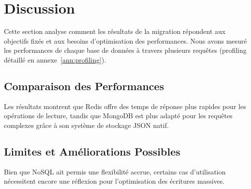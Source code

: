 \chapter{Discussion}
Cette section analyse comment les résultats de la migration répondent aux objectifs fixés et aux besoins d’optimisation des performances. Nous avons mesuré les performances de chaque base de données à travers plusieurs requêtes (profiling détaillé en annexe~\ref{ann:profiling}).

\section{Comparaison des Performances}
Les résultats montrent que Redis offre des temps de réponse plus rapides pour les opérations de lecture, tandis que MongoDB est plus adapté pour les requêtes complexes grâce à son système de stockage JSON natif.

\section{Limites et Améliorations Possibles}
Bien que NoSQL ait permis une flexibilité accrue, certains cas d'utilisation nécessitent encore une réflexion pour l'optimisation des écritures massives.
